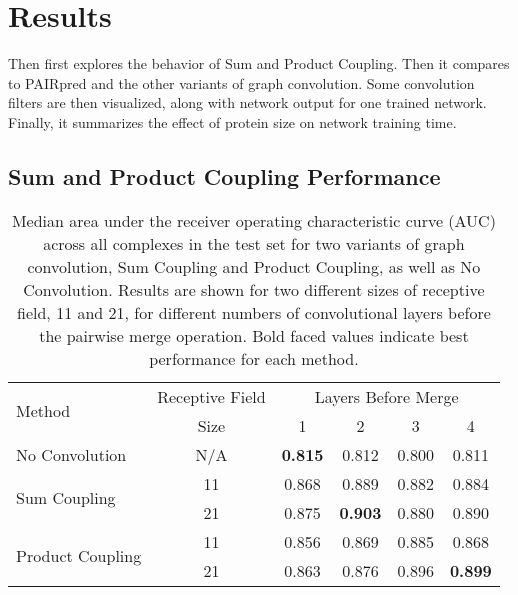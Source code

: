 \chapter{Results}
\label{chap:results}


Then first explores the behavior of Sum and Product Coupling.
Then it compares to PAIRpred and the other variants of graph convolution.
Some convolution filters are then visualized, along with network output for one trained network.
Finally, it summarizes the effect of protein size on network training time.


\section{Sum and Product Coupling Performance}

\begin{table}
	\begin{center}
		\begin{tabular}{lccccc}
			\toprule
			\multirow{2}{*}{Method} &
			Receptive Field & \multicolumn{4}{c}{Layers Before Merge} \\
			& Size & 1 & {2} & {3} & {4} \\
			\midrule
			No Convolution & N/A & \textbf{0.815} & 0.812 & 0.800 & 0.811  \\\cline{1-6}
			\multirow{2}{*}{Sum Coupling} & 11 & 0.868 & 0.889 & 0.882 & 0.884 \\
			& 21 & 0.875 & \textbf{0.903} & 0.880 & 0.890 \\\cline{1-6}
			\multirow{2}{*}{Product Coupling} & 11 & 0.856 & 0.869 & 0.885 & 0.868 \\
			& 21 & 0.863 & 0.876 & 0.896 & \textbf{0.899} \\
			\bottomrule
		\end{tabular}
		\caption{Median area under the receiver operating characteristic curve (AUC) across all complexes in the test set for two variants of graph convolution, Sum Coupling and Product Coupling, as well as No Convolution. Results are shown for two different sizes of receptive field, 11 and 21, for different numbers of convolutional layers before the pairwise merge operation. Bold faced values indicate best performance for each method.
		\label{tab:med_auc}}
	\end{center}
\end{table}

